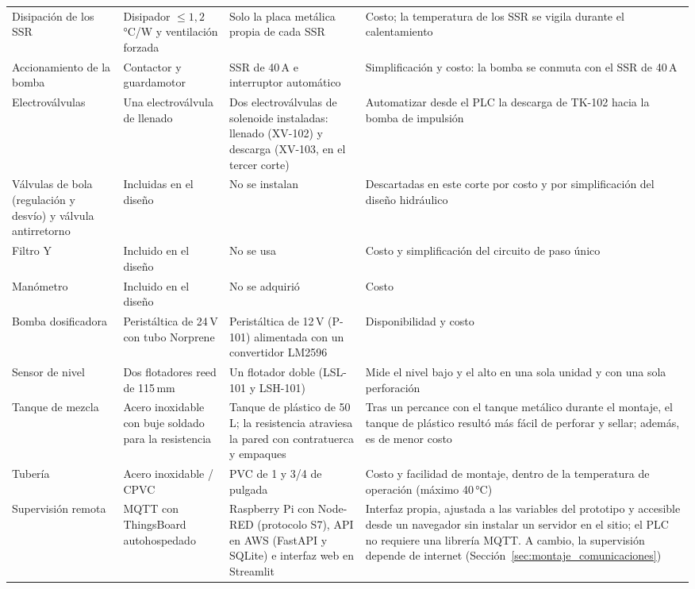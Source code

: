 \begin{longtable}{L{2.6cm}L{3.9cm}L{4.4cm}L{\dimexpr\textwidth-10.9cm-8\tabcolsep\relax}}
Disipación de los SSR & Disipador $\leq 1{,}2$\,°C/W y ventilación forzada & Solo la placa metálica propia de cada SSR & Costo; la temperatura de los SSR se vigila durante el calentamiento\\
Accionamiento de la bomba & Contactor y guardamotor & SSR de 40\,A e interruptor automático & Simplificación y costo: la bomba se conmuta con el SSR de 40\,A\\
Electroválvulas & Una electroválvula de llenado & Dos electroválvulas de solenoide instaladas: llenado (XV-102) y descarga (XV-103, en el tercer corte) & Automatizar desde el PLC la descarga de TK-102 hacia la bomba de impulsión\\
Válvulas de bola (regulación y desvío) y válvula antirretorno & Incluidas en el diseño & No se instalan & Descartadas en este corte por costo y por simplificación del diseño hidráulico\\
Filtro Y & Incluido en el diseño & No se usa & Costo y simplificación del circuito de paso único\\
Manómetro & Incluido en el diseño & No se adquirió & Costo\\
Bomba dosificadora & Peristáltica de 24\,V con tubo Norprene & Peristáltica de 12\,V (P-101) alimentada con un convertidor LM2596 & Disponibilidad y costo\\
Sensor de nivel & Dos flotadores reed de 115\,mm & Un flotador doble (LSL-101 y LSH-101) & Mide el nivel bajo y el alto en una sola unidad y con una sola perforación\\
Tanque de mezcla & Acero inoxidable con buje soldado para la resistencia & Tanque de plástico de 50\,L; la resistencia atraviesa la pared con contratuerca y empaques & Tras un percance con el tanque metálico durante el montaje, el tanque de plástico resultó más fácil de perforar y sellar; además, es de menor costo\\
Tubería & Acero inoxidable / CPVC & PVC de 1 y 3/4 de pulgada & Costo y facilidad de montaje, dentro de la temperatura de operación (máximo 40\,°C)\\
Supervisión remota & MQTT con ThingsBoard autohospedado & Raspberry Pi con Node-RED (protocolo S7), API en AWS (FastAPI y SQLite) e interfaz web en Streamlit & Interfaz propia, ajustada a las variables del prototipo y accesible desde un navegador sin instalar un servidor en el sitio; el PLC no requiere una librería MQTT. A cambio, la supervisión depende de internet (Sección~\ref{sec:montaje_comunicaciones})\\
\end{longtable}
\endgroup
